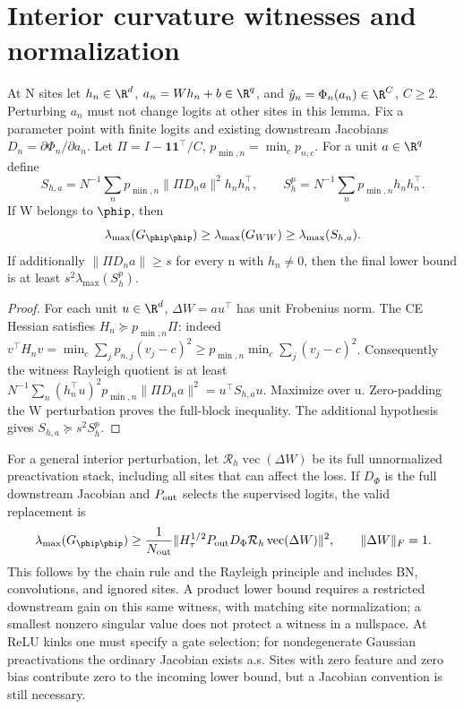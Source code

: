 \section{Interior curvature witnesses and normalization}
\label{sec:astra_interior}
\begin{lemma}
\label{lem:astra_interior}
At N sites let $h_n\in\R^d$, $a_n=Wh_n+b\in\R^q$, and
$\hat y_n=\Phi_n(a_n)\in\R^C$, $C\ge2$.
Perturbing $a_n$ must not change logits at other sites in this lemma.
Fix a parameter point with finite logits and existing downstream
Jacobians $D_n=\partial\Phi_n/\partial a_n$. Let
$\Pi=I-\boldsymbol1\boldsymbol1^\top/C$,
$p_{\min,n}=\min_c p_{n,c}$. For a unit $a\in\R^q$ define
\[
 S_{h,a}=N^{-1}\sum_n p_{\min,n}\|\Pi D_na\|^2h_nh_n^\top,
 \qquad S_h^p=N^{-1}\sum_n p_{\min,n}h_nh_n^\top.
\]
If W belongs to $\phip$, then
\[
 \lambda_{\max}(G_{\phip\phip})\ge\lambda_{\max}(G_{WW})
 \ge\lambda_{\max}(S_{h,a}).
\]
If additionally $\|\Pi D_na\|\ge s$ for every n with $h_n\ne0$,
then the final lower bound is at least $s^2\lambda_{\max}(S_h^p)$.
\end{lemma}
\begin{proof}
For each unit $u\in\R^d$, $\Delta W=au^\top$ has unit Frobenius norm.
The CE Hessian satisfies $H_n\succeq p_{\min,n}\Pi$: indeed
$v^\top H_nv=\min_c\sum_jp_{n,j}(v_j-c)^2
\ge p_{\min,n}\min_c\sum_j(v_j-c)^2$.
Consequently the witness Rayleigh quotient is at least
$N^{-1}\sum_n(h_n^\top u)^2p_{\min,n}\|\Pi D_na\|^2
=u^\top S_{h,a}u$. Maximize over u. Zero-padding the W perturbation
proves the full-block inequality. The additional hypothesis gives
$S_{h,a}\succeq s^2S_h^p$.
\end{proof}
\begin{remark}
For a general interior perturbation, let $\mathcal R_h\operatorname{vec}
(\Delta W)$ be its full unnormalized preactivation stack, including all
sites that can affect the loss. If $D_\Phi$ is the full downstream
Jacobian and $P_{\rm out}$ selects the supervised logits, the valid
replacement is
\begin{equation}\label{eq:astra_full_witness}
 \lambda_{\max}(G_{\phip\phip})\ge
 \frac1{N_{\rm out}}\|H_\tau^{1/2}P_{\rm out}D_\Phi
       \mathcal R_h\operatorname{vec}(\Delta W)\|^2,
 \qquad\|\Delta W\|_F=1.
\end{equation}
This follows by the chain rule and the Rayleigh principle and includes
BN, convolutions, and ignored sites. A product lower bound requires a
restricted downstream gain on this same witness, with matching site
normalization; a smallest nonzero singular value does not protect a
witness in a nullspace. At ReLU kinks one must specify a gate selection;
for nondegenerate Gaussian preactivations the ordinary Jacobian exists
a.s. Sites with zero feature and zero bias contribute zero to the
incoming lower bound, but a Jacobian convention is still necessary.
\end{remark}

